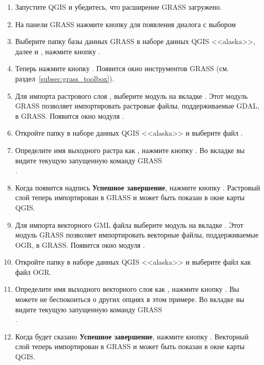\begin{enumerate}
  \item Запустите QGIS и убедитесь, что расширение GRASS загружено.
  \item На панели GRASS нажмите кнопку 
  для появления диалога с выбором 
  \item Выберите папку базы данных GRASS  в наборе
  данных QGIS <<alaska>>, далее  и 
  , нажмите кнопку .
  \item Теперь нажмите кнопку .
  Появится окно инструментов GRASS (см. раздел~\ref{subsec:grass_toolbox}).
  \item Для импорта растрового слоя , выберите
  модуль  на вкладке . Этот
  модуль GRASS позволяет импортировать растровые файлы, поддерживаемые
  GDAL, в  GRASS. Появится окно модуля .
  \item Откройте папку  в наборе данных QGIS <<alaska>>
  и выберите файл .
  \item Определите имя выходного растра как ,
  нажмите кнопку . Во вкладке  вы видите
  текущую запущенную команду GRASS \\
  .
  \item Когда появится надпись \textbf{Успешное завершение}, нажмите кнопку
  . Растровый слой 
  теперь импортирован в GRASS и может быть показан в окне карты QGIS.
  \item Для импорта векторного GML файла  выберите
  модуль  на вкладке . Этот модуль
  GRASS позволяет импортировать векторные файлы, поддерживаемые OGR, в
   GRASS. Появится окно модуля .
  \item Откройте папку  в наборе данных QGIS <<alaska>>
  и выберите файл  как файл OGR.
  \item Определите имя выходного векторного слоя как ,
  нажмите кнопку . Вы можете не беспокоиться о других
  опциях в этом примере. Во вкладке  вы видите текущую
  запущенную команду GRASS \\
  .
  \item Когда будет сказано \textbf{Успешное завершение}, нажмите кнопку
  . Векторный слой  теперь
  импортирован в GRASS и может быть показан в окне карты QGIS.
\end{enumerate}


